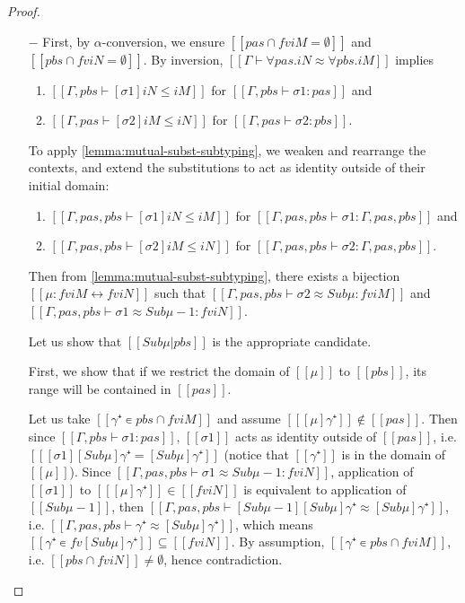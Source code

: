 \begin{proof}
    \hfill
  \begin{itemize}
    \item[$-$]
      First, by $\alpha$-conversion, we ensure $[[{pas} ∩ fv iM = ∅]]$ and $[[{pbs} ∩ fv iN = ∅]]$.
      By inversion, $[[Γ ⊢ ∀pas.iN ≈ ∀pbs.iM ]]$ implies 
      \begin{enumerate} 
        \item $[[Γ,pbs ⊢ [σ1]iN ≤ iM]]$ for $[[ Γ,pbs ⊢ σ1 :{pas} ]]$ and 
        \item $[[Γ,pas ⊢ [σ2]iM ≤ iN]]$ for $[[ Γ,pas ⊢ σ2 : {pbs} ]]$.
      \end{enumerate}
      To apply \cref{lemma:mutual-subst-subtyping}, we weaken 
      and rearrange the contexts, and extend the substitutions to act as identity
      outside of their initial domain:
      \begin{enumerate} 
        \item $[[Γ, {pas}, {pbs} ⊢ [σ1]iN ≤ iM]]$ for $[[ Γ, {pas}, {pbs} ⊢ σ1 : Γ, {pas}, {pbs} ]]$ and 
        \item $[[Γ, {pas}, {pbs} ⊢ [σ2]iM ≤ iN]]$ for $[[ Γ, {pas}, {pbs} ⊢ σ2 : Γ, {pas}, {pbs} ]]$.
      \end{enumerate}
      Then from \cref{lemma:mutual-subst-subtyping}, 
      there exists a bijection $[[μ : fv iM ↔ fv iN]]$ such that 
      $[[Γ, {pas}, {pbs} ⊢ σ2 ≈ Sub μ :  fv iM]]$ and 
      $[[Γ, {pas}, {pbs} ⊢ σ1 ≈ Sub μ-1 :  fv iN]]$. 

      Let us show that $[[Sub μ|{pbs}]]$ is the appropriate candidate.

      First, we show that if we restrict the domain of $[[μ]]$ to 
      $[[pbs]]$, its range will be contained in $[[pas]]$.

      Let us take $[[γ⁺ ∊ {pbs} ∩ fv iM]]$ and 
      assume $[[ [μ]γ⁺]] \notin [[pas]]$.
      Then since $[[ Γ,pbs ⊢ σ1 :{pas} ]]$, 
      $[[σ1]]$ acts as identity outside of $[[pas]]$, i.e.
      $[[ [σ1][Sub μ]γ⁺ = [Sub μ]γ⁺ ]]$ (notice that $[[γ⁺]]$ is in the domain of $[[μ]]$).
      Since
      $[[Γ, {pas}, {pbs} ⊢ σ1 ≈ Sub μ-1 :  fv iN]]$, 
      application of $[[σ1]]$ to $[[ [μ]γ⁺ ]] \in [[fv iN]]$
      is equivalent to application of $[[Sub μ-1]]$, then 
      $[[ Γ, {pas}, {pbs} ⊢ [Sub μ-1][Sub μ]γ⁺ ≈ [Sub μ]γ⁺ ]]$, i.e.
      $[[Γ, {pas}, {pbs} ⊢ γ⁺ ≈ [Sub μ]γ⁺]]$, 
      which means $[[γ⁺ ∊ fv [Sub μ]γ⁺]] \subseteq [[fv iN]]$.
      By assumption, $[[γ⁺ ∊ {pbs} ∩ fv iM]]$, i.e. $[[{pbs} ∩ fv iN]] \neq \emptyset$, hence contradiction.


\end{itemize}
\end{proof}

